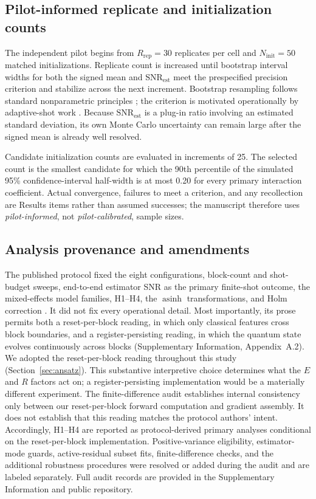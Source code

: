 \documentclass[pdflatex,sn-basic,Numbered]{sn-jnl}
\newcommand{\snrest}{\mathrm{SNR}_{\mathrm{est}}}
\begin{document}
\subsection{Pilot-informed replicate and initialization counts}
\label{sec:calibration}

The independent pilot begins from $R_{\mathrm{rep}}=30$ replicates per cell and $N_{\mathrm{init}}=50$ matched initializations. Replicate count is increased until bootstrap interval widths for both the signed mean and $\snrest$ meet the prespecified precision criterion and stabilize across the next increment. Bootstrap resampling follows standard nonparametric principles \cite{davison1997bootstrap}; the criterion is motivated operationally by adaptive-shot work \cite{tamiya2022stochastic}. Because $\snrest$ is a plug-in ratio involving an estimated standard deviation, its own Monte Carlo uncertainty can remain large after the signed mean is already well resolved.

Candidate initialization counts are evaluated in increments of 25. The selected count is the smallest candidate for which the 90th percentile of the simulated 95\% confidence-interval half-width is at most 0.20 for every primary interaction coefficient. Actual convergence, failures to meet a criterion, and any recollection are Results items rather than assumed successes; the manuscript therefore uses \emph{pilot-informed}, not \emph{pilot-calibrated}, sample sizes.


\subsection{Analysis provenance and amendments}\label{sec:provenance}

The published protocol fixed the eight configurations, block-count and shot-budget sweeps, end-to-end estimator SNR as the primary finite-shot outcome, the mixed-effects model families, H1--H4, the $\operatorname{asinh}$ transformations, and Holm correction \cite{shen2026gradient}. It did not fix every operational detail. Most importantly, its prose permits both a reset-per-block reading, in which only classical features cross block boundaries, and a register-persisting reading, in which the quantum state evolves continuously across blocks (Supplementary Information, Appendix~A.2). We adopted the reset-per-block reading throughout this study (Section~\ref{sec:ansatz}). This substantive interpretive choice determines what the $E$ and $R$ factors act on; a register-persisting implementation would be a materially different experiment. The finite-difference audit establishes internal consistency only between our reset-per-block forward computation and gradient assembly. It does not establish that this reading matches the protocol authors' intent. Accordingly, H1--H4 are reported as protocol-derived primary analyses conditional on the reset-per-block implementation. Positive-variance eligibility, estimator-mode guards, active-residual subset fits, finite-difference checks, and the additional robustness procedures were resolved or added during the audit and are labeled separately. Full audit records are provided in the Supplementary Information and public repository.
\end{document}
